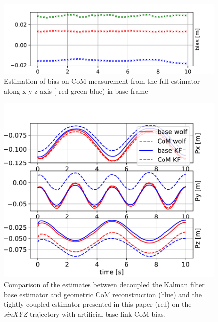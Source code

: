 \begin{figure}[t]
    \centering
    \includegraphics[width=0.8\columnwidth]{figures/centroidal/com_bias_est.pdf}
    \caption{Estimation of bias on CoM measurement from the full estimator along x-y-z axis ( red-green-blue) in base frame}
    \label{fig:bias_est}
\end{figure}

\begin{figure}[t]
    \centering
    \includegraphics[height=0.6\columnwidth]{figures/centroidal/base_com_position_wolf_vs_KF.pdf}
    \caption{Comparison of the estimates between decoupled the Kalman filter base estimator and geometric CoM reconstruction (blue) and 
    the tightly coupled estimator presented in this paper (red) on the \textit{sinXYZ} trajectory with artificial base link CoM bias.}
    \label{fig:comparison_KF_wolf}
\end{figure}


